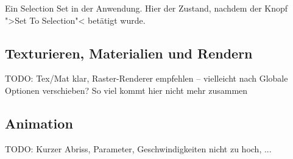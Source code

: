 \documentclass[10pt,DIV=14,a4paper]{scrartcl}
\begin{document}
{Ein Selection Set in der Anwendung. Hier der Zustand, nachdem der Knopf
">Set To Selection"< betätigt wurde.}

\subsection{Texturieren, Materialien und Rendern}
TODO: Tex/Mat klar, Raster-Renderer empfehlen -- vielleicht nach Globale
Optionen verschieben? So viel kommt hier nicht mehr zusammen

\subsection{Animation}
TODO: Kurzer Abriss, Parameter, Geschwindigkeiten nicht zu hoch, ...

\end{document}
